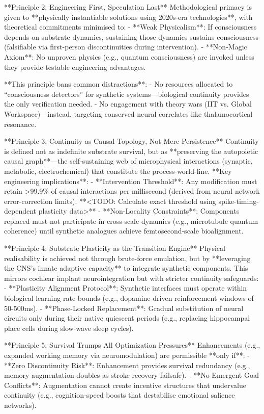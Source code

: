 \documentclass[10pt]{article}
\begin{document}
\begin{sloppypar}
  **Principle 2: Engineering First, Speculation Last**
  Methodological primacy is given to **physically instantiable solutions using 2020s-era technologies**, with theoretical commitments minimised to:
  - **Weak Physicalism**: If consciousness depends on substrate dynamics, sustaining those dynamics sustains consciousness (falsifiable via first-person discontinuities during intervention).
  - **Non-Magic Axiom**: No unproven physics (e.g., quantum consciousness) are invoked unless they provide testable engineering advantages.

  **This principle bans common distractions**:
  - No resources allocated to “consciousness detectors” for synthetic systems—biological continuity provides the only verification needed.
  - No engagement with theory wars (IIT vs. Global Workspace)—instead, targeting conserved neural correlates like thalamocortical resonance.

  **Principle 3: Continuity as Causal Topology, Not Mere Persistence**
  Continuity is defined not as indefinite substrate survival, but as **preserving the autopoietic causal graph**—the self-sustaining web of microphysical interactions (synaptic, metabolic, electrochemical) that constitute the process-world-line. **Key engineering implications**:
  - **Intervention Threshold**: Any modification must retain >99.9\% of causal interactions per millisecond (derived from neural network error-correction limits). **<TODO: Calculate exact threshold using spike-timing-dependent plasticity data>**
  - **Non-Locality Constraints**: Components replaced must not participate in cross-scale dynamics (e.g., microtubule quantum coherence) until synthetic analogues achieve femtosecond-scale bioalignment.

  **Principle 4: Substrate Plasticity as the Transition Engine**
  Physical realisability is achieved not through brute-force emulation, but by **leveraging the CNS’s innate adaptive capacity** to integrate synthetic components. This mirrors cochlear implant neurointegration but with stricter continuity safeguards:
  - **Plasticity Alignment Protocol**: Synthetic interfaces must operate within biological learning rate bounds (e.g., dopamine-driven reinforcement windows of 50-500ms).
  - **Phase-Locked Replacement**: Gradual substitution of neural circuits only during their native quiescent periods (e.g., replacing hippocampal place cells during slow-wave sleep cycles).

  **Principle 5: Survival Trumps All Optimization Pressures**
  Enhancements (e.g., expanded working memory via neuromodulation) are permissible **only if**:
  - **Zero Discontinuity Risk**: Enhancement provides survival redundancy (e.g., memory augmentation doubles as stroke recovery failsafe).
  - **No Emergent Goal Conflicts**: Augmentation cannot create incentive structures that undervalue continuity (e.g., cognition-speed boosts that destabilise emotional salience networks).


\end{sloppypar}
\end{document}

